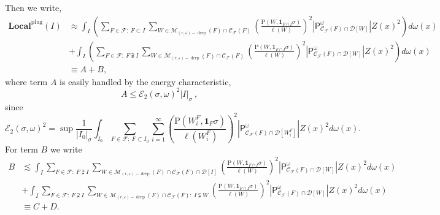 \documentclass{amsart}%
\theoremstyle{plain}
\numberwithin{equation}{section}
\begin{document}
Then we write,%
\begin{align*}
\mathbf{Local}^{\operatorname{plug}}\left(  I\right)    & \approx\int
_{I}\left(  \sum_{F\in\mathcal{F}:\ F\subset I}\sum_{W\in\mathcal{M}_{\left(
r,\varepsilon\right)  -\operatorname*{deep}}\left(  F\right)  \cap
\mathcal{C}_{\mathcal{F}}\left(  F\right)  }\left(  \frac{\mathrm{P}\left(
W,\mathbf{1}_{F\cap I}\sigma\right)  }{\ell\left(  W\right)  }\right)
^{2}\left\vert \mathsf{P}_{\mathcal{C}_{\mathcal{F}}\left(  F\right)
\cap\mathcal{D}\left[  W\right]  }^{\omega}\right\vert Z\left(  x\right)
^{2}\right)  d\omega\left(  x\right)  \\
& +\int_{I}\left(  \sum_{F\in\mathcal{F}:\ F\supsetneqq I}\sum_{W\in
\mathcal{M}_{\left(  r,\varepsilon\right)  -\operatorname*{deep}}\left(
F\right)  \cap\mathcal{C}_{\mathcal{F}}\left(  F\right)  }\left(
\frac{\mathrm{P}\left(  W,\mathbf{1}_{F\cap I}\sigma\right)  }{\ell\left(
W\right)  }\right)  ^{2}\left\vert \mathsf{P}_{\mathcal{C}_{\mathcal{F}%
}\left(  F\right)  \cap\mathcal{D}\left[  W\right]  }^{\omega}\right\vert
Z\left(  x\right)  ^{2}\right)  d\omega\left(  x\right)  \\
& \equiv A+B,
\end{align*}
where term $A$ is easily handled by the energy characteristic,%
\[
A\leq\mathcal{E}_{2}\left(  \sigma,\omega\right)  ^{2}\left\vert I\right\vert
_{\sigma}\ ,
\]
since%
\[
\mathcal{E}_{2}\left(  \sigma,\omega\right)  ^{2}=\sup\frac{1}{\left\vert
I_{0}\right\vert _{\sigma}}\int_{I_{0}}\sum_{F\in\mathcal{F}:\ F\subset I_{0}%
}\sum_{i=1}^{\infty}\left(  \frac{\mathrm{P}\left(  W_{i}^{F},\mathbf{1}%
_{F}\sigma\right)  }{\ell\left(  W_{i}^{F}\right)  }\right)  ^{2}\left\vert
\mathsf{P}_{\mathcal{C}_{\mathcal{F}}\left(  F\right)  \cap\mathcal{D}\left[
W_{i}^{F}\right]  }^{\omega}\right\vert Z\left(  x\right)  ^{2}d\omega\left(
x\right)  .
\]
For term $B$ we write%
\begin{align*}
B  & \lesssim\int_{I}\sum_{F\in\mathcal{F}:\ F\supsetneqq I}\sum
_{W\in\mathcal{M}_{\left(  r,\varepsilon\right)  -\operatorname*{deep}}\left(
F\right)  \cap\mathcal{C}_{\mathcal{F}}\left(  F\right)  \cap\mathcal{D}%
\left[  I\right]  }\left(  \frac{\mathrm{P}\left(  W,\mathbf{1}_{F\cap
I}\sigma\right)  }{\ell\left(  W\right)  }\right)  ^{2}\left\vert
\mathsf{P}_{\mathcal{C}_{\mathcal{F}}\left(  F\right)  \cap\mathcal{D}\left[
W\right]  }^{\omega}\right\vert Z\left(  x\right)  ^{2}d\omega\left(
x\right)  \\
& +\int_{I}\sum_{F\in\mathcal{F}:\ F\supsetneqq I}\sum_{W\in\mathcal{M}%
_{\left(  r,\varepsilon\right)  -\operatorname*{deep}}\left(  F\right)
\cap\mathcal{C}_{\mathcal{F}}\left(  F\right)  :\ I\subsetneqq W}\left(
\frac{\mathrm{P}\left(  W,\mathbf{1}_{F\cap I}\sigma\right)  }{\ell\left(
W\right)  }\right)  ^{2}\left\vert \mathsf{P}_{\mathcal{C}_{\mathcal{F}%
}\left(  F\right)  \cap\mathcal{D}\left[  W\right]  }^{\omega}\right\vert
Z\left(  x\right)  ^{2}d\omega\left(  x\right)  \\
& \equiv C+D.
\end{align*}
\end{document}
